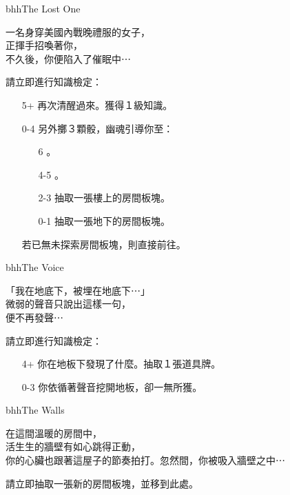 \begin{EventCard}{bhh}{The Lost One}
  \begin{CardStory}
    一名身穿美國內戰晚禮服的女子，\\
    正揮手招喚著你，\\
    不久後，你便陷入了催眠中⋯
  \end{CardStory}
  \footnotesize
  請立即進行知識檢定：
  \begin{itemize}
    \item[5+] 再次清醒過來。獲得１級知識。
    \item[0-4] 另外擲３顆骰，幽魂引導你至：
      \begin{itemize}
        \item[6] 。
        \item[4-5] 。
        \item[2-3] 抽取一張樓上的房間板塊。
        \item[0-1] 抽取一張地下的房間板塊。
      \end{itemize}
      若已無未探索房間板塊，則直接前往。
  \end{itemize}
\end{EventCard}%
\linebreak[0]%
\begin{EventCard}{bhh}{The Voice}
  \begin{CardStory}
    「我在地底下，被埋在地底下⋯」\\
    微弱的聲音只說出這樣一句，\\
    便不再發聲⋯
  \end{CardStory}
  請立即進行知識檢定：
  \begin{itemize}
    \item[4+] 你在地板下發現了什麼。抽取１張道具牌。
    \item[0-3] 你依循著聲音挖開地板，卻一無所獲。
  \end{itemize}
\end{EventCard}%
\linebreak[0]%
\begin{EventCard}{bhh}{The Walls}
  \begin{CardStory}
    在這間溫暖的房間中，\\
    活生生的牆壁有如心跳得正動，\\
    你的心臟也跟著這屋子的節奏拍打。忽然間，你被吸入牆壁之中⋯
  \end{CardStory}
  請立即抽取一張新的房間板塊，並移到此處。\smallbreak
\end{EventCard}%
